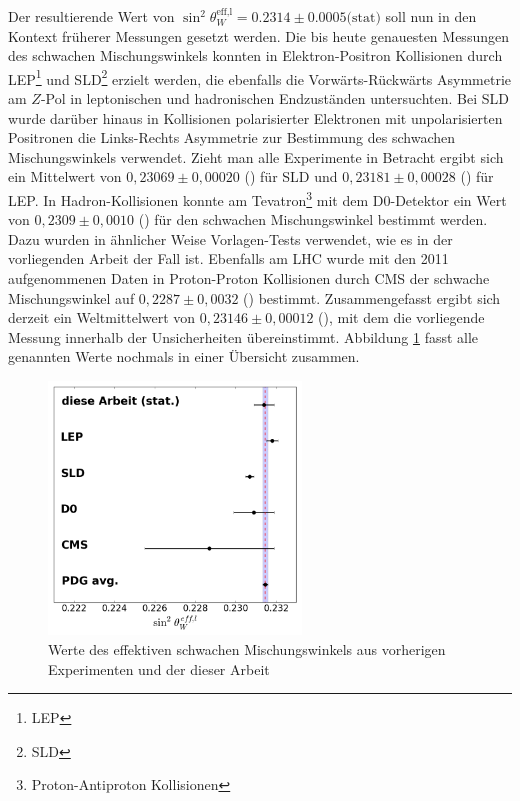 Der resultierende Wert von $\sin^2\theta_W^\text{eff,l}=0.2314\pm0.0005
\text{(stat)}$ soll nun in den Kontext früherer Messungen gesetzt werden. Die
bis heute genauesten Messungen des schwachen Mischungswinkels konnten in
Elektron-Positron Kollisionen durch LEP\footnote{\acf{LEP}} und
SLD\footnote{\acf{SLD}} erzielt werden, die ebenfalls die Vorwärts-Rückwärts
Asymmetrie am $Z$-Pol in leptonischen und hadronischen Endzuständen
untersuchten. Bei \ac{SLD} wurde darüber hinaus in Kollisionen polarisierter
Elektronen mit unpolarisierten Positronen die Links-Rechts Asymmetrie zur
Bestimmung des schwachen Mischungswinkels verwendet. Zieht man alle Experimente
in Betracht ergibt sich ein Mittelwert von $0,23069\pm0,00020$
(\cite{PhysRevD.86.010001}) für \ac{SLD} und $0,23181\pm0,00028$
(\cite{PhysRevD.86.010001}) für \ac{LEP}. In Hadron-Kollisionen konnte am
Tevatron\footnote{Proton-Antiproton Kollisionen} mit dem D0-Detektor ein Wert
von $0,2309\pm0,0010$ (\cite{Abazov:2011ws}) für den schwachen Mischungswinkel
bestimmt werden. Dazu wurden in ähnlicher Weise Vorlagen-Tests verwendet, wie
es in der vorliegenden Arbeit der Fall ist. Ebenfalls am \ac{LHC} wurde mit den
2011 aufgenommenen Daten in Proton-Proton Kollisionen durch \acs{CMS} der
schwache Mischungswinkel auf $0,2287\pm0,0032$ (\cite{Chatrchyan:2011ya})
bestimmt. Zusammengefasst ergibt sich derzeit ein Weltmittelwert von
$0,23146\pm0,00012$ (\cite{PhysRevD.86.010001}), mit dem die vorliegende
Messung innerhalb der Unsicherheiten übereinstimmt. Abbildung
\ref{fig:results_comparison} fasst alle genannten Werte nochmals in einer
Übersicht zusammen.

\begin{figure}[h]
    \centering
    \includegraphics[width=0.6\textwidth]{plots/sin2theta_comparison}
    \caption[Werte des effektiven schwachen Mischungswinkels aus vorherigen
        Experimenten]
        {Werte des effektiven schwachen Mischungswinkels aus vorherigen
        Experimenten und der dieser Arbeit}
    \label{fig:results_comparison}
\end{figure}

